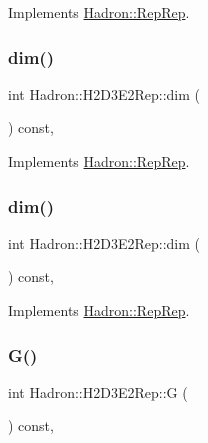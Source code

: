 Implements \mbox{\hyperlink{structHadron_1_1RepRep_a92c8802e5ed7afd7da43ccfd5b7cd92b}{Hadron\+::\+Rep\+Rep}}.

\mbox{\label{structHadron_1_1H2D3E2Rep_ad034b5f609721e406b181c1e1e66ca4a}} 
\subsubsection{\texorpdfstring{dim()}{dim()}\hspace{0.1cm}{\footnotesize\ttfamily [2/3]}}
{\footnotesize\ttfamily int Hadron\+::\+H2\+D3\+E2\+Rep\+::dim (\begin{DoxyParamCaption}{ }\end{DoxyParamCaption}) const\hspace{0.3cm}{\ttfamily [inline]}, {\ttfamily [virtual]}}



Implements \mbox{\hyperlink{structHadron_1_1RepRep_a92c8802e5ed7afd7da43ccfd5b7cd92b}{Hadron\+::\+Rep\+Rep}}.

\mbox{\label{structHadron_1_1H2D3E2Rep_ad034b5f609721e406b181c1e1e66ca4a}} 
\subsubsection{\texorpdfstring{dim()}{dim()}\hspace{0.1cm}{\footnotesize\ttfamily [3/3]}}
{\footnotesize\ttfamily int Hadron\+::\+H2\+D3\+E2\+Rep\+::dim (\begin{DoxyParamCaption}{ }\end{DoxyParamCaption}) const\hspace{0.3cm}{\ttfamily [inline]}, {\ttfamily [virtual]}}



Implements \mbox{\hyperlink{structHadron_1_1RepRep_a92c8802e5ed7afd7da43ccfd5b7cd92b}{Hadron\+::\+Rep\+Rep}}.

\mbox{\label{structHadron_1_1H2D3E2Rep_acf948fba347a3cbb8ca79c0bb60eaf23}} 
\subsubsection{\texorpdfstring{G()}{G()}\hspace{0.1cm}{\footnotesize\ttfamily [1/2]}}
{\footnotesize\ttfamily int Hadron\+::\+H2\+D3\+E2\+Rep\+::G (\begin{DoxyParamCaption}{ }\end{DoxyParamCaption}) const\hspace{0.3cm}{\ttfamily [inline]}, {\ttfamily [virtual]}}


